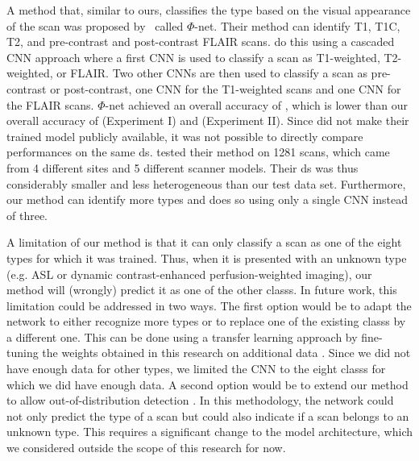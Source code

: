 A method that, similar to ours, classifies the \gls{type} based on the visual appearance of the \gls{scan} was proposed by~\autocite{remedios2018classifying} called $\Phi$-net.
Their method can identify \gls{T1}, \gls{T1C}, \gls{T2}, and pre-contrast and post-contrast FLAIR \glspl{scan}.
 do this using a cascaded \gls{CNN} approach where a first \gls{CNN} is used to classify a \gls{scan} as T1-weighted, T2-weighted, or FLAIR.
Two other \glspl{CNN} are then used to classify a \gls{scan} as pre-contrast or post-contrast, one \gls{CNN} for the T1-weighted \glspl{scan} and one \gls{CNN} for the FLAIR \glspl{scan}.
$\Phi$-net achieved an overall accuracy of , which is lower than our overall accuracy of  (Experiment I) and  (Experiment II).
Since  did not make their trained model publicly available, it was not possible to directly compare performances on the same \gls{ds}.
 tested their method on 1281 \glspl{scan}, which came from 4 different \glspl{site} and 5 different scanner models.
Their \gls{ds} was thus considerably smaller and less heterogeneous than our test data set.
Furthermore, our method can identify more \glspl{type} and does so using only a single \gls{CNN} instead of three.

A limitation of our method is that it can only classify a \gls{scan} as one of the eight \glspl{type} for which it was trained.
Thus, when it is presented with an unknown \gls{type} (e.g. \gls{ASL} or dynamic contrast-enhanced perfusion-weighted imaging), our method will (wrongly) predict it as one of the other \glspl{class}.
In future work, this limitation could be addressed in two ways.
The first option would be to adapt the network to either recognize more \glspl{type} or to replace one of the existing \glspl{class} by a different one.
This can be done using a transfer learning approach by fine-tuning the weights obtained in this research on additional data \autocite{tajbakhsh2016convolutional}.
Since we did not have enough data for other \glspl{type}, we limited the \gls{CNN} to the eight \glspl{class} for which we did have enough data.
A second option would be to extend our method to allow out-of-distribution detection \autocite{devries2018learning}.
In this methodology, the network could not only predict the \gls{type} of a \gls{scan} but could also indicate if a \gls{scan} belongs to an unknown \gls{type}.
This requires a significant change to the model architecture, which we considered outside the scope of this research for now.


